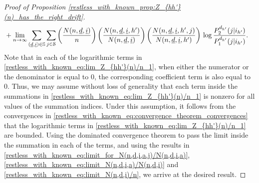 \begin{proof}[Proof of Proposition \ref{restless_with_known_prop:Z_{hh'}(n)_has_the_right_drift}]
\begin{align}
	&+\lim\limits_{n\to\infty}\sum\limits_{(\underline{d},\underline{i})\in\mathbb{S}}\sum\limits_{j\in\mathcal{S}}\left(\frac{N(n,\underline{d},\underline{i})}{n}\right)\left(\frac{N(n,\underline{d},\underline{i},h')}{N(n,\underline{d},\underline{i})}\right)\left(\frac{N(n,\underline{d},\underline{i},h',j)}{N(n,\underline{d},\underline{i},h')}\right)\,\log\frac{P_2^{d_{h'}}(j|i_{h'})}{P_1^{d_{h'}}(j|i_{h'})}.\label{restless_with_known_eq:lim_Z_{hh'}(n)/n_1}
\end{align}
Note that in each of the logarithmic terms in \eqref{restless_with_known_eq:lim_Z_{hh'}(n)/n_1}, when either the numerator or the denominator is equal to $0$, the corresponding coefficient term is also equal to $0$. Thus, we may assume without loss of generality that each term inside the summations in \eqref{restless_with_known_eq:lim_Z_{hh'}(n)/n_1} is nonzero for all values of the summation indices. Under this assumption, it follows from the convergences in  \eqref{restless_with_known_eq:convergence_theorem_convergences} that the logarithmic terms in \eqref{restless_with_known_eq:lim_Z_{hh'}(n)/n_1} are bounded.
Using the dominated convergence theorem to pass the limit inside the summation in each of the terms, and using the results in \eqref{restless_with_known_eq:limit_for_N(n,d,i,a,j)/N(n,d,i,a)}, \eqref{restless_with_known_eq:limit_N(n,d,i,a)/N(n,d,i)} and \eqref{restless_with_known_eq:limit_N(n,d,i)/n}, we arrive at the desired result.
\end{proof}

